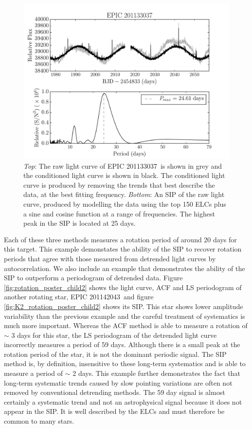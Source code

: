 \documentclass[useAMS, usenatbib, preprint, 12pt]{aastex}
\newcommand{\rpc}{201133037}
\newcommand{\rpcc}{201142043}
\begin{document}
\begin{figure}
\begin{center}
\includegraphics[width=6in, clip=true]{K2_rotation_201133037.pdf}
\caption{{\it Top}: The raw light curve of EPIC \rpc\ is shown in grey and
	the conditioned light curve is shown in black. The conditioned light
	curve is produced by removing the trends that best describe the
	data, at the best fitting frequency. {\it Bottom}: An SIP of the raw
	light curve, produced by modelling the data using the top 150 ELCs
	plus a sine and cosine function at a range of frequencies.
	The highest peak in the SIP is located at 25 days.}
\label{fig:K2_rotation_poster_child}
\end{center}
\end{figure}

Each of these three methods measures a rotation period of around 20 days for
this target.
This example demonstates the ability of the SIP to recover rotation periods
that agree with those measured from detrended light curves by autocorrelation.
We also include an example that demonstrates the ability of the SIP to
outperform a periodogram of detrended data.
Figure \ref{fig:rotation_poster_child2} shows the light curve, ACF and LS
periodogram of another rotating star, EPIC \rpcc\ and figure
\ref{fig:K2_rotation_poster_child2} shows its SIP.
This star shows lower amplitude variability than the previous example and the
careful treatment of systematics is much more important.
Whereas the ACF method is able to measure a rotation of $\sim$ 3 days for
this star, the LS periodogram of the detrended light curve incorrectly
measures a period of 59 days.
Although there is a small peak at the rotation period of the star, it is not
the dominant periodic signal.
The SIP method is, by definition, insensitive to these long-term systematics
and is able to measure a period of $\sim$ 2 days.
This example further demonstrates the fact that long-term systematic trends
caused by slow pointing variations are often not removed by conventional
detrending methods.
The 59 day signal is almost certainly a systematic trend and not an
astrophysical signal because it does not appear in the SIP.
It is well described by the ELCs and must therefore be common to many stars.
\end{document}
